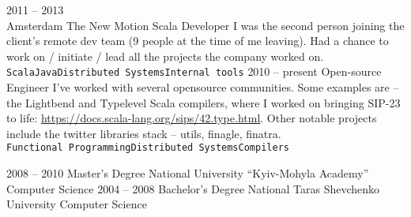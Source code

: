 \documentclass[9pt]{developercv} %
\begin{document}
\begin{entrylist}
	\entry
		{2011 -- 2013\\\footnotesize{Amsterdam}}
		{The New Motion}
		{Scala Developer}
		{I was the second person joining the client's remote dev team (9 people at the time of me leaving). Had a chance to work on / initiate / lead all the projects the company worked on.\\ \texttt{Scala}\slashsep\texttt{Java}\slashsep\texttt{Distributed Systems}\slashsep\texttt{Internal tools}}
	\entry
		{2010 -- present}
		{Open-source}
		{Engineer}
		{I've worked with several opensource communities. Some examples are -- the Lightbend and Typelevel Scala compilers, where I worked on bringing SIP-23 to life: \href{https://docs.scala-lang.org/sips/42.type.html}{https://docs.scala-lang.org/sips/42.type.html}. Other notable projects include the twitter libraries stack -- utils, finagle, finatra.\\ \texttt{Functional Programming}\slashsep\texttt{Distributed Systems}\slashsep\texttt{Compilers}}
\end{entrylist}



\begin{entrylist}
	\entry
		{2008 -- 2010}
		{Master's Degree}
		{National University “Kyiv-Mohyla Academy”}
		{Computer Science}
	\entry
		{2004 -- 2008}
		{Bachelor's Degree}
		{National Taras Shevchenko University}
		{Computer Science}
\end{entrylist}

\end{document}
